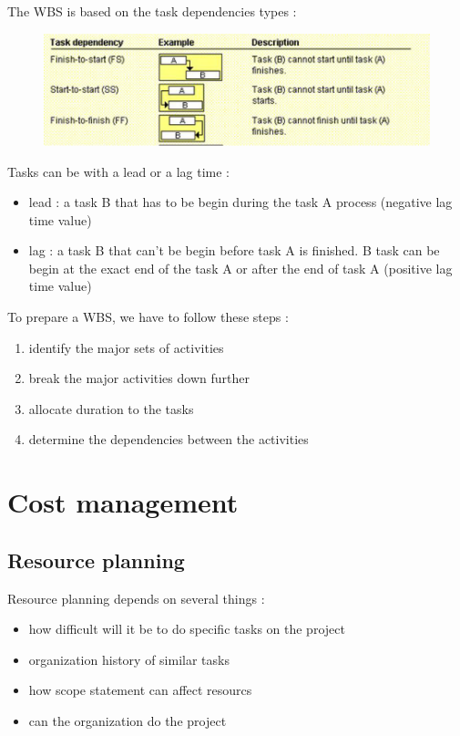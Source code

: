 \documentclass{article}
\begin{document}
The WBS is based on the task dependencies types :
\begin{figure}[H]
	\centering
	\includegraphics[scale=0.3]{TaskDependency.png}
	\caption{}
\end{figure}

Tasks can be with a lead or a lag time :
\begin{itemize}
	\item lead : a task B that has to be begin during the task A process (negative lag time value)
	\item lag : a task B that can't be begin before task A is finished. B task can be begin at the exact end of the task A or after the end of task A (positive lag time value)
\end{itemize}

To prepare a WBS, we have to follow these steps :
\begin{enumerate}
	\item identify the major sets of activities
	\item break the major activities down further
	\item allocate duration to the tasks
	\item determine the dependencies between the activities
\end{enumerate}

\section{Cost management}
\subsection{Resource planning}
Resource planning depends on several things :
\begin{itemize}
    \item how difficult will it be to do specific tasks on the project
    \item organization history of similar tasks
    \item how scope statement can affect resourcs
    \item can  the organization do the project
\end{itemize}
\end{document}
